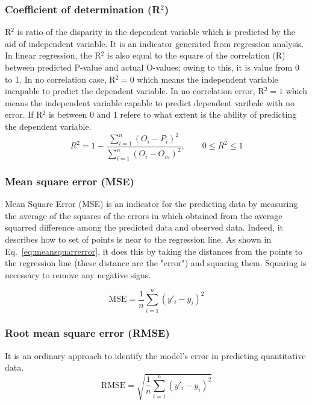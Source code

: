 \documentclass[pdflatex,sn-mathphys-num]{sn-jnl}%
\theoremstyle{thmstyleone}%
\theoremstyle{thmstyletwo}%
\theoremstyle{thmstylethree}%
\begin{document}
\subsubsection{Coefficient of determination (R$^{2}$)}
R$^{2}$ is ratio of the disparity in the dependent variable which is predicted by the aid of independent variable. It is an indicator generated from regression analysis. In linear regression, the R$^{2}$ is also equal to the square of the correlation (R) between predicted P-value and actual O-values; owing to this, it is value from 0 to 1. In no correlation case, R$^{2}=0$ which means the independent variable incapable to predict the dependent variable. In no correlation error, R$^{2}=1$ which means the independent variable capable to predict dependent varibale with no error. If R$^{2}$ is between 0 and 1 refere to what extent is the ability of predicting the dependent variable.
\begin{equation}
R^2 = 1 - 
\frac{\sum_{i=1}^{n}(O_i - P_i)^2}
{\sum_{i=1}^{n}(O_i - O_m)^2},
\qquad 0 \leq R^2 \leq 1
\label{eq:r_square}
\end{equation}

\subsubsection{Mean square error (MSE)}
Mean Square Error (MSE) is an indicator for the predicting data by measuring the average of the squares of the errors in which obtained from the average squarred difference among the predicted data and observed data. Indeed, it describes how to set of points is near to the regression line. As shown in Eq.~\eqref{eq:meansquarrerror}, it does this by taking the distances from the points to the regression line (these distance are the "error") and squaring them. Squaring is necessary to remove any negative signs.

\begin{equation}
\mathrm{MSE} = \frac{1}{n} \sum_{i=1}^{n} \left( y'_i - y_i \right)^2
\tag{15}
\label{eq:meansquareerror}
\end{equation}

\subsubsection{Root mean square error (RMSE)}
It is an ordinary approach to identify the model's error in predicting quantitative data.
\begin{equation}
\mathrm{RMSE} = \sqrt{ \frac{1}{n} \sum_{i=1}^{n} \left( y'_i - y_i \right)^2 }
\tag{16}
\label{eq:rootmeanse}
\end{equation}
\end{document}
